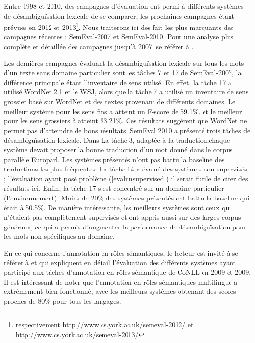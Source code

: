 Entre 1998 et 2010, des campagnes d'évaluation ont permi à différents systèmes de désambiguïsation lexicale de se comparer, les prochaines campagnes étant prévues en 2012 et 2013\footnote{respectivement http://www.cs.york.ac.uk/semeval-2012/ et http://www.cs.york.ac.uk/semeval-2013/}. Nous traiterons ici des fait les plus marquants des campagnes récentes : SemEval-2007 et SemEval-2010. Pour une analyse plus complète et détaillée des campagnes jusqu'à 2007, se référer à \cite{navigli2009word}.

Les dernières campagnes évaluant la désambiguïsation lexicale sur tous les mots d'un texte sans domaine particulier sont les tâches 7 et 17 de SemEval-2007, la différence principale étant l'inventaire de sens utilisé. En effet, la tâche 17 a utilisé WordNet 2.1 et le WSJ, alors que la tâche 7 a utilisé un inventaire de sens grossier basé sur WordNet et des textes provenant de différents domaines. Le meilleur système pour les sens fins a atteint un F-score de 59.1\%, et le meilleur pour les sens grossiers à atteint 83.21\%. Ces résultats suggèrent que WordNet ne permet pas d'atteindre de bons résultats. SemEval 2010 a présenté trois tâches de désambiguïsation lexicale. Dans La tâche 3, adaptée à la traduction,chaque système devait proposer la bonne traduction d'un mot donné dans le corpus parallèle Europarl. Les systèmes présentés n'ont pas battu la baseline des traductions les plus fréquentes. La tâche 14 a évalué des systèmes non supervisés ; l'évaluation ayant posé problème (\ref{evalunsupervised}) il serait futile de citer des résultats ici. Enfin, la tâche 17 s'est concentré sur un domaine particulier (l'environnement). Moins de 20\% des systèmes présentés ont battu la baseline qui était à 50.5\%. De manière intéressante, les meilleurs systèmes sont ceux qui n'étaient pas complètement supervisés et ont appris aussi sur des larges corpus généraux, ce qui a permis d'augmenter la performance de désambiguïsation pour les mots non spécifiques au domaine.

En ce qui concerne l'annotation en rôles sémantiques, le lecteur est invité à se référer à \citep{surdeanu2008conll} et \citep{hajic2009conll} qui expliquent en détail l'évaluation des différents systèmes ayant participé aux tâches d'annotation en rôles sémantique de CoNLL en 2009 et 2009. Il est intéressant de noter que l'annotation en rôles sémantiques multilingue a extrêmement bien fonctionné, avec les meilleurs systèmes obtenant des scores proches de 80\% pour tous les langages.


